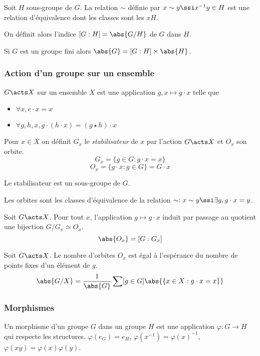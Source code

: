 \documentclass[a4paper,11pt,twocolumn]{article}
\begin{document}
       Soit $H$ sous-groupe de $G$. La relation $\sim$ définie par $x\sim y\ssi x^{-1}y\in H$ est une relation d'équivalence dont les classes sont les $xH$.

      On définit alors l'indice $[G:H] = \abs{G/H}$ de $G$ dans $H$.

       Si $G$ est un groupe fini alors $\abs{G} = [G:H] \times \abs{H}$.

    \subsubsection{Action d'un groupe sur un ensemble}

       $G\acts X$ sur un ensemble $X$ est une application $g,x\mapsto g\cdot x$ telle que
      \begin{itemize}
        \item $\forall x, e\cdot x = x$
        \item $\forall g,h,x, g\cdot(h\cdot x) = (g\star h)\cdot x$
      \end{itemize}

       Pour $x\in X$ on définit $G_x$ le \emph{stabilisateur} de $x$ par l'action $G\acts X$ et $O_x$ son orbite.
      \[G_x = \{ g\in G: g\cdot x = x \}\]
      \[O_x = \{ g\cdot x: g\in G \} = G\cdot x\]   

      Le stabilisateur est un sous-groupe de $G$.

      Les orbites sont les classes d'équivalence de la relation $\sim: x\sim y\ssi \exists g, g\cdot x = y$.

       Soit $G\acts X$. Pour tout $x$, l'application $g\mapsto g\cdot x$ induit par passage au quotient une bijection $G/G_x \simeq O_x$.
      \[\abs{O_x} = [G:G_x]\]

       Soit $G\acts X$. Le nombre d'orbites $O_x$ est égal à l'espérance du nombre de points fixes d'un élément de $g$.
      \[\abs{G/X} = \frac1{\abs{G}}\sum[g\in G]{\abs{\{x\in X: g\cdot x = x\}}}\]

    \subsubsection{Morphismes}

       Un morphisme d'un groupe $G$ dans un groupe $H$ est une application $\varphi:G\rightarrow H$ qui respecte les structures. $\varphi(e_G) = e_H$, $\varphi(x^{-1}) = \varphi(x)^{-1}$, $\varphi(xy) = \varphi(x)\varphi(y)$.
\end{document}
